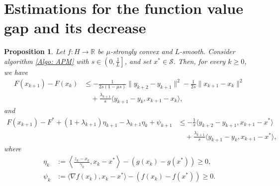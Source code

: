 \documentclass[pdflatex,sn-mathphys-num]{sn-jnl}
\theoremstyle{thmstyleone}
\newtheorem{proposition}[theorem]{Proposition}
\theoremstyle{thmstyletwo}
\theoremstyle{thmstylethree}
\newcommand{\R}{\mathbb{R}}
\begin{document}
\section{Estimations for the function value gap and its decrease}\label{Sec: estimations}
\begin{proposition}\label{Prop: F_estimate}
Let $f:H\to\R$ be $\mu$-strongly convex and $L$-smooth. Consider algorithm \eqref{Algo: APM} with $s\in\left( 0,\frac{1}{L} \right]$, and set $x^*\in\mathcal{S}$. Then, for every $k\ge 0$, we have
\begin{align*}
F(x_{k+1}) - F(x_k) 
&\le - \frac{1}{2s(1-\mu s)} \| y_{k+2} - y_{k+1} \|^2 
    - \frac{1}{2s}\| x_{k+1} - x_k \|^2 \\
&\quad + \frac{\lambda_{k+1}}{s} \langle y_{k+1}-y_k, x_{k+1} - x_k \rangle, 
\end{align*}
and
\begin{align*}
F(x_{k+1}) - F^* + (1+\lambda_{k+1})\eta_{k+1} - \lambda_{k+1} \eta_k + \psi_{k+1} 
&\le - \frac{1}{s} \langle y_{k+2}-y_{k+1}, x_{k+1}-x^* \rangle \\
&\quad + \frac{\lambda_{k+1}}{s} \langle y_{k+1}-y_k, x_{k+1} - x^* \rangle,
\end{align*}
where
\begin{align*}
\eta_k &:= \left\langle \frac{z_k-x_k}{\gamma_k}, x_k - x^* \right\rangle - \left( g(x_k) - g(x^*) \right)\ge 0,\\
\psi_k &:= \langle \nabla f(x_k), x_k - x^* \rangle - \left( f(x_k) - f(x^*) \right) \ge 0.
\end{align*}
\end{proposition}
\end{document}
